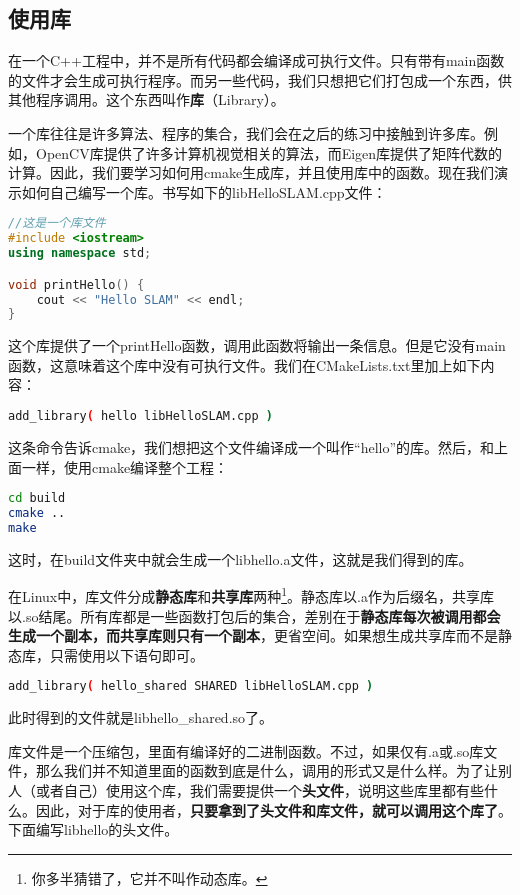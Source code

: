 \subsection{使用库}
在一个C++工程中，并不是所有代码都会编译成可执行文件。只有带有main函数的文件才会生成可执行程序。而另一些代码，我们只想把它们打包成一个东西，供其他程序调用。这个东西叫作\textbf{库}（Library）。

一个库往往是许多算法、程序的集合，我们会在之后的练习中接触到许多库。例如，OpenCV库提供了许多计算机视觉相关的算法，而Eigen库提供了矩阵代数的计算。因此，我们要学习如何用cmake生成库，并且使用库中的函数。现在我们演示如何自己编写一个库。书写如下的libHelloSLAM.cpp文件：

\begin{lstlisting}[language=c++,caption=slambook2/ch2/libHelloSLAM.cpp]
//这是一个库文件
#include <iostream>
using namespace std;

void printHello() {
	cout << "Hello SLAM" << endl;
}
\end{lstlisting}

这个库提供了一个printHello函数，调用此函数将输出一条信息。但是它没有main函数，这意味着这个库中没有可执行文件。我们在CMakeLists.txt里加上如下内容：
\begin{lstlisting}[language=sh,caption=slambook2/ch2/CMakeLists.txt]
add_library( hello libHelloSLAM.cpp )
\end{lstlisting}

这条命令告诉cmake，我们想把这个文件编译成一个叫作“hello”的库。然后，和上面一样，使用cmake编译整个工程：
\begin{lstlisting}[language=sh,caption=终端输入：]
cd build
cmake ..
make
\end{lstlisting}
这时，在build文件夹中就会生成一个libhello.a文件，这就是我们得到的库。

在Linux中，库文件分成\textbf{静态库}和\textbf{共享库}两种\footnote{你多半猜错了，它并不叫作动态库。}。静态库以.a作为后缀名，共享库以.so结尾。所有库都是一些函数打包后的集合，差别在于\textbf{静态库每次被调用都会生成一个副本，而共享库则只有一个副本}，更省空间。如果想生成共享库而不是静态库，只需使用以下语句即可。
\begin{lstlisting}[language=sh,caption=slambook2/ch2/CMakeLists.txt]
add_library( hello_shared SHARED libHelloSLAM.cpp )
\end{lstlisting}
此时得到的文件就是libhello\_shared.so了。

库文件是一个压缩包，里面有编译好的二进制函数。不过，如果仅有.a或.so库文件，那么我们并不知道里面的函数到底是什么，调用的形式又是什么样。为了让别人（或者自己）使用这个库，我们需要提供一个\textbf{头文件}，说明这些库里都有些什么。因此，对于库的使用者，\textbf{只要拿到了头文件和库文件，就可以调用这个库了}。下面编写libhello的头文件。

